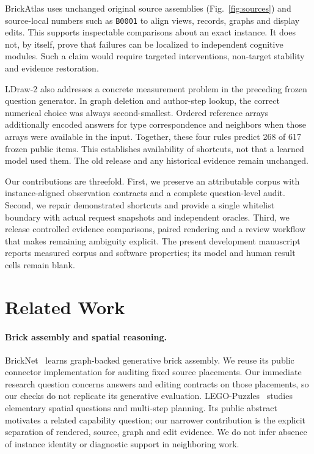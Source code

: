 \documentclass[10pt,twocolumn,letterpaper]{article}
\begin{document}
BrickAtlas uses unchanged original source assemblies
(Fig.~\ref{fig:sources}) and source-local numbers such as
\texttt{B0001} to align views, records, graphs and display edits.
This supports inspectable comparisons about an exact instance. It
does not, by itself, prove that failures can be localized to independent
cognitive modules. Such a claim would require targeted interventions,
non-target stability and evidence restoration.

LDraw-2 also addresses a concrete measurement problem in the preceding
frozen question generator. In graph deletion and author-step lookup,
the correct numerical choice was always second-smallest. Ordered
reference arrays additionally encoded answers for type correspondence
and neighbors when those arrays were available in the input. Together,
these four rules predict 268 of 617 frozen public items. This establishes
availability of shortcuts, not that a learned model used them.
The old release and any historical evidence remain unchanged.

Our contributions are threefold. First, we preserve an attributable
corpus with instance-aligned observation contracts and a complete
question-level audit. Second, we repair demonstrated shortcuts and
provide a single whitelist boundary with actual request snapshots and
independent oracles. Third, we release controlled evidence comparisons,
paired rendering and a review workflow that makes remaining ambiguity
explicit. The present development manuscript reports measured corpus
and software properties; its model and human result cells remain blank.

\section{Related Work}
\paragraph{Brick assembly and spatial reasoning.}
BrickNet~\cite{kulits2026bricknet} learns graph-backed generative brick
assembly. We reuse its public connector implementation for auditing
fixed source placements. Our immediate research question concerns
answers and editing contracts on those placements, so our checks do
not replicate its generative evaluation.
LEGO-Puzzles~\cite{tang2025legopuzzles} studies elementary spatial
questions and multi-step planning. Its public abstract motivates a
related capability question; our narrower contribution is the explicit
separation of rendered, source, graph and edit evidence. We do not infer
absence of instance identity or diagnostic support in neighboring work.
\end{document}
